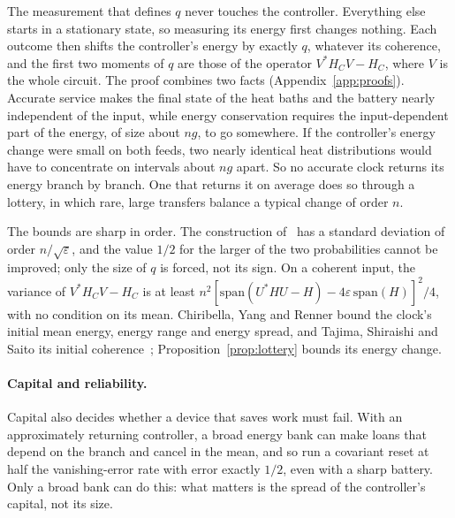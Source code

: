 \documentclass[11pt]{article}
\theoremstyle{definition}
\theoremstyle{remark}
\begin{document}
The measurement that defines $q$ never touches the controller. Everything else starts in a stationary state, so measuring its energy first changes nothing. Each outcome then shifts the controller's energy by exactly $q$, whatever its coherence, and the first two moments of $q$ are those of the operator $V^*H_CV-H_C$, where $V$ is the whole circuit. The proof combines two facts (Appendix~\ref{app:proofs}). Accurate service makes the final state of the heat baths and the battery nearly independent of the input, while energy conservation requires the input-dependent part of the energy, of size about $ng$, to go somewhere. If the controller's energy change were small on both feeds, two nearly identical heat distributions would have to concentrate on intervals about $ng$ apart. So no accurate clock returns its energy branch by branch. One that returns it on average does so through a lottery, in which rare, large transfers balance a typical change of order $n$.

The bounds are sharp in order. The construction of~\cite{SaveWork} has a standard deviation of order $n/\sqrt\varepsilon$, and the value $1/2$ for the larger of the two probabilities cannot be improved; only the size of $q$ is forced, not its sign. On a coherent input, the variance of $V^*H_CV-H_C$ is at least $n^2[\mathrm{span}(U^*HU-H)-4\varepsilon\,\mathrm{span}(H)]^2/4$, with no condition on its mean. Chiribella, Yang and Renner bound the clock's initial mean energy, energy range and energy spread, and Tajima, Shiraishi and Saito its initial coherence~\cite{ChiribellaYangRenner21,TSS20}; Proposition~\ref{prop:lottery} bounds its energy change.

\paragraph{Capital and reliability.} Capital also decides whether a device that saves work must fail. With an approximately returning controller, a broad energy bank can make loans that depend on the branch and cancel in the mean, and so run a covariant reset at half the vanishing-error rate with error exactly $1/2$, even with a sharp battery. Only a broad bank can do this: what matters is the spread of the controller's capital, not its size.
\end{document}
